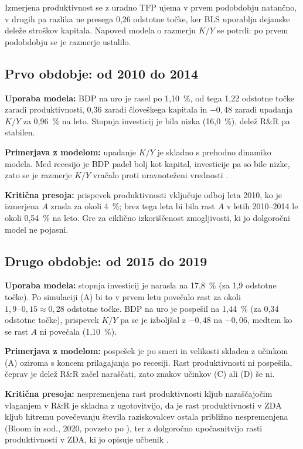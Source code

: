 \documentclass[12pt,a4paper]{article}
\begin{document}
Izmerjena produktivnost se z uradno TFP ujema v prvem podobdobju natančno, v drugih pa razlika ne presega 0,26 odstotne točke, ker BLS uporablja dejanske deleže stroškov kapitala. Napoved modela o razmerju $K/Y$ se potrdi: po prvem podobdobju se je razmerje ustalilo.

\subsection{Prvo obdobje: od 2010 do 2014}
\textbf{Uporaba modela:} BDP na uro je rasel po 1,10~\%, od tega 1,22 odstotne točke zaradi produktivnosti, 0,36 zaradi človeškega kapitala in $-0{,}48$ zaradi upadanja $K/Y$ za 0,96~\% na leto. Stopnja investicij je bila nizka (16,0~\%), delež R\&R pa stabilen.

\textbf{Primerjava z modelom:} upadanje $K/Y$ je skladno s prehodno dinamiko modela. Med recesijo je BDP padel bolj kot kapital, investicije pa so bile nizke, zato se je razmerje $K/Y$ vračalo proti uravnoteženi vrednosti \parencite[pros.~30,~56--57]{grobovsek2026}.

\textbf{Kritična presoja:} prispevek produktivnosti vključuje odboj leta 2010, ko je izmerjena $A$ zrasla za okoli 4~\%; brez tega leta bi bila rast $A$ v letih 2010--2014 le okoli 0,54~\% na leto. Gre za ciklično izkoriščenost zmogljivosti, ki jo dolgoročni model ne pojasni.

\subsection{Drugo obdobje: od 2015 do 2019}
\textbf{Uporaba modela:} stopnja investicij je narasla na 17,8~\% (za 1,9 odstotne točke). Po simulaciji (A) bi to v prvem letu povečalo rast za okoli $1{,}9\cdot0{,}15\approx0{,}28$ odstotne točke. BDP na uro je pospešil na 1,44~\% (za 0,34 odstotne točke), prispevek $K/Y$ pa se je izboljšal z $-0{,}48$ na $-0{,}06$, medtem ko se rast $A$ ni povečala (1,10~\%).

\textbf{Primerjava z modelom:} pospešek je po smeri in velikosti skladen z učinkom (A) oziroma s koncem prilagajanja po recesiji. Rast produktivnosti ni pospešila, čeprav je delež R\&R začel naraščati, zato znakov učinkov (C) ali (D) še ni.

\textbf{Kritična presoja:} nespremenjena rast produktivnosti kljub naraščajočim vlaganjem v R\&R je skladna z ugotovitvijo, da je rast produktivnosti v ZDA kljub hitremu povečevanju števila raziskovalcev ostala približno nespremenjena (Bloom in sod., 2020, povzeto po \cite[pros.~136--137]{grobovsek2026}), ter z dolgoročno upočasnitvijo rasti produktivnosti v ZDA, ki jo opisuje učbenik \parencite[str.~129]{garin2021}.
\end{document}
